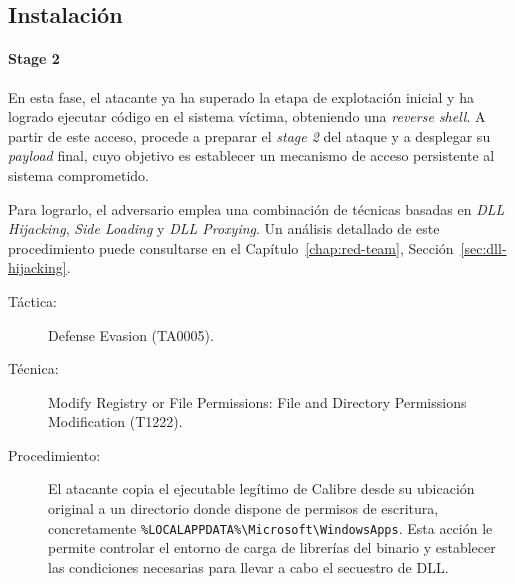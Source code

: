 \subsection{Instalación}

\paragraph{Stage 2} En esta fase, el atacante ya ha superado la etapa de explotación inicial y ha logrado ejecutar código en el sistema víctima, obteniendo una \textit{reverse shell}. A partir de este acceso, procede a preparar el \textit{stage 2} del ataque y a desplegar su \textit{payload} final, cuyo objetivo es establecer un mecanismo de acceso persistente al sistema comprometido.

Para lograrlo, el adversario emplea una combinación de técnicas basadas en \textit{DLL Hijacking}, \textit{Side Loading} y \textit{DLL Proxying}. Un análisis detallado de este procedimiento puede consultarse en el Capítulo~\ref{chap:red-team}, Sección~\ref{sec:dll-hijacking}.

\begin{leftbar}
    \begin{description}
        \item[Táctica:] Defense Evasion (TA0005).
        \item[Técnica:] Modify Registry or File Permissions: File and Directory Permissions Modification (T1222).
        \item[Procedimiento:]  
        El atacante copia el ejecutable legítimo de Calibre desde su ubicación original a un directorio donde dispone de permisos de escritura, concretamente \texttt{\%LOCALAPPDATA\%\textbackslash Microsoft\textbackslash WindowsApps}. Esta acción le permite controlar el entorno de carga de librerías del binario y establecer las condiciones necesarias para llevar a cabo el secuestro de DLL.
    \end{description}
\end{leftbar}

